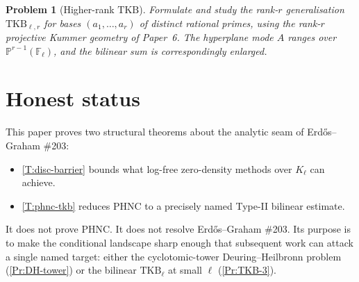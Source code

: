 \documentclass[11pt]{article}
\newtheorem{problem}{Problem}
\newcommand{\F}{\mathbb F}
\newcommand{\Pj}{\mathbb P}
\newcommand{\1}{\mathbf 1}
\begin{document}
\begin{problem}[Higher-rank \(\mathrm{TKB}\)]\label{Pr:TKB-higher}
Formulate and study the rank-\(r\) generalisation \(\mathrm{TKB}_{\ell,r}\) for bases \((a_1,\ldots,a_r)\) of distinct rational primes, using the rank-\(r\) projective Kummer geometry of Paper~6.  The hyperplane mode \(A\) ranges over \(\Pj^{r-1}(\F_\ell)\), and the bilinear sum is correspondingly enlarged.
\end{problem}

\section{Honest status}

This paper proves two structural theorems about the analytic seam of Erd\H{o}s--Graham \#203:
\begin{itemize}[leftmargin=2em]
\item \cref{T:disc-barrier} bounds what log-free zero-density methods over \(K_\ell\) can achieve.
\item \cref{T:phnc-tkb} reduces PHNC to a precisely named Type-II bilinear estimate.
\end{itemize}
It does not prove PHNC.  It does not resolve Erd\H{o}s--Graham \#203.  Its purpose is to make the conditional landscape sharp enough that subsequent work can attack a single named target: either the cyclotomic-tower Deuring--Heilbronn problem (\cref{Pr:DH-tower}) or the bilinear \(\mathrm{TKB}_\ell\) at small \(\ell\) (\cref{Pr:TKB-3}).
\end{document}
